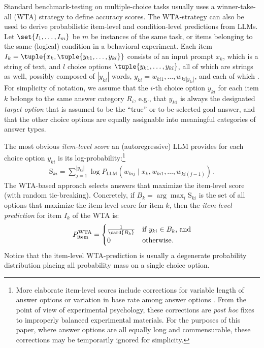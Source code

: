 \documentclass[fleqn]{article}
\begin{document}
Standard benchmark-testing on multiple-choice tasks usually uses a winner-take-all (WTA) strategy \citep[e.g.,][]{srivastava2023-BIGbench} to define accuracy scores.
The WTA-strategy can also be used to derive probabilistic item-level and condition-level predictions from LLMs.
Let $\set{I_{1}, \dots, I_{m}}$ be $m$ be instances of the same task, or items belonging to the same (logical) condition in a behavioral experiment.
Each item $I_{k} = \tuple{x_{k}, \tuple{y_{k1}, \dots, y_{kl}}}$ consists of an input prompt $x_{k}$, which is a string of text, and $l$ choice options $\tuple{y_{k1}, \dots, y_{kl}}$, all of which are strings as well, possibly composed of $|y_{ki}|$ words, $y_{ki} = w_{ki1}, \dots, w_{ki|y_{ki}|}$, and each of which .
For simplicity of notation, we assume that the $i$-th choice option $y_{ki}$ for each item $k$ belongs to the same answer category $R_{i}$, e.g., that $y_{k1}$ is always the designated \emph{target option} that is assumed to be the ``true'' or to-be-selected goal answer, and that the other choice options are equally assignable into meaningful categories of answer types.

The most obvious \emph{item-level score} an (autoregressive) LLM provides for each choice option $y_{ki}$ is its log-probability:\footnote{
  More elaborate item-level scores include corrections for variable length of answer options \citep[e.g.,][]{BrownMann2020:Language-Models} or variation in base rate among answer options \citep[e.g.,][]{HoltzmanWest2021:Surface-Form-Co}.
  From the point of view of experimental psychology, these corrections are \emph{post hoc} fixes to improperly balanced experimental materials.
  For the purposes of this paper, where answer options are all equally long and commensurable, these corrections may be temporarily ignored for simplicity.
}
%
\begin{align*}
  \text{S}_{ki}
  =  \sum_{j=1}^{|y_{ki}|} \log P_{\text{LLM}} \left(w_{kij} \mid x_{k}, w_{ki1}, \dots, w_{ki(j-1)} \right)  \,.
\end{align*}
%
The WTA-based approach selects answers that maximize the item-level score (with random tie-breaking).
Concretely, if $B_{k} = \arg \max_{i} \text{S}_{ki}$ is the set of all options that maximize the item-level score for item $k$, then the \emph{item-level prediction} for item $I_{k}$ of the WTA is:
%
\begin{align*}
  P_{\text{item}}^{\text{WTA}} =
  \begin{cases}
    \frac{1}{\card{B_{k}}} & \text{if } y_{ki} \in B_{k} \text{, and} \\
    0                     & \text{otherwise.}
  \end{cases}
\end{align*}
%
Notice that the item-level WTA-prediction is usually a degenerate probability distribution placing all probability mass on a single choice option.
\end{document}
